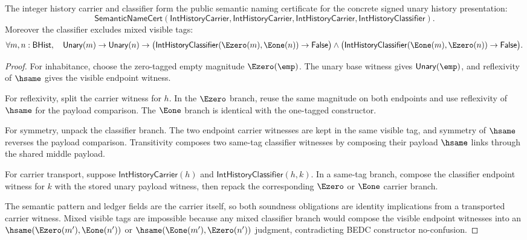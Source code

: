 \begin{theorem}
\label{thm:concrete-int-history-semantic-namecert}
The integer history carrier and classifier form the public semantic naming
certificate for the concrete signed unary history presentation:
$$
\mathsf{SemanticNameCert}(
\mathsf{IntHistoryCarrier},
\mathsf{IntHistoryCarrier},
\mathsf{IntHistoryCarrier},
\mathsf{IntHistoryClassifier}).
$$
Moreover the classifier excludes mixed visible tags:
$$
\forall m,n:\mathsf{BHist},\quad
\mathsf{Unary}(m)\to\mathsf{Unary}(n)\to
\bigl(\mathsf{IntHistoryClassifier}(\Ezero(m),\Eone(n))\to\mathsf{False}\bigr)
\land
\bigl(\mathsf{IntHistoryClassifier}(\Eone(m),\Ezero(n))\to\mathsf{False}\bigr).
$$
\end{theorem}
\begin{proof}
For inhabitance, choose the zero-tagged empty magnitude
$\Ezero(\emp)$. The unary base witness gives $\mathsf{Unary}(\emp)$, and
reflexivity of $\hsame$ gives the visible endpoint witness.

For reflexivity, split the carrier witness for $h$. In the $\Ezero$ branch,
reuse the same magnitude on both endpoints and use reflexivity of $\hsame$ for
the payload comparison. The $\Eone$ branch is identical with the one-tagged
constructor.

For symmetry, unpack the classifier branch. The two endpoint carrier witnesses
are kept in the same visible tag, and symmetry of $\hsame$ reverses the payload
comparison. Transitivity composes two same-tag classifier witnesses by composing
their payload $\hsame$ links through the shared middle payload.

For carrier transport, suppose $\mathsf{IntHistoryCarrier}(h)$ and
$\mathsf{IntHistoryClassifier}(h,k)$. In a same-tag branch, compose the
classifier endpoint witness for $k$ with the stored unary payload witness, then
repack the corresponding $\Ezero$ or $\Eone$ carrier branch.

The semantic pattern and ledger fields are the carrier itself, so both
soundness obligations are identity implications from a transported carrier
witness. Mixed visible tags are impossible because any mixed classifier branch
would compose the visible endpoint witnesses into an
$\hsame(\Ezero(m'),\Eone(n'))$ or
$\hsame(\Eone(m'),\Ezero(n'))$ judgment, contradicting BEDC constructor
no-confusion.
\end{proof}

